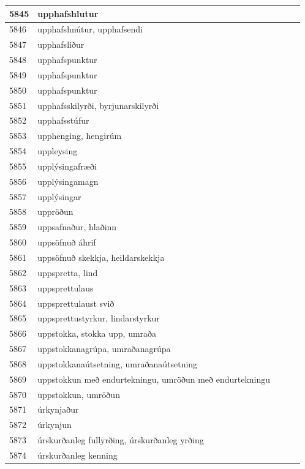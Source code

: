 \begin{longtable}{p{}|p{}|p{}|p{}|p{}}
\hline
5845 & upphafshlutur &  &  &  \\
\hline
5846 & upphafshnútur, upphafsendi &  &  &  \\
\hline
5847 & upphafsliður &  &  &  \\
\hline
5848 & upphafspunktur &  &  &  \\
\hline
5849 & upphafspunktur &  &  &  \\
\hline
5850 & upphafspunktur &  &  &  \\
\hline
5851 & upphafsskilyrði, byrjunarskilyrði &  &  &  \\
\hline
5852 & upphafsstúfur &  &  &  \\
\hline
5853 & upphenging, hengirúm &  &  &  \\
\hline
5854 & uppleysing &  &  &  \\
\hline
5855 & upplýsingafræði &  &  &  \\
\hline
5856 & upplýsingamagn &  &  &  \\
\hline
5857 & upplýsingar &  &  &  \\
\hline
5858 & uppröðun &  &  &  \\
\hline
5859 & uppsafnaður, hlaðinn &  &  &  \\
\hline
5860 & uppsöfnuð áhrif &  &  &  \\
\hline
5861 & uppsöfnuð skekkja, heildarskekkja &  &  &  \\
\hline
5862 & uppspretta, lind &  &  &  \\
\hline
5863 & uppsprettulaus &  &  &  \\
\hline
5864 & uppsprettulaust svið &  &  &  \\
\hline
5865 & uppsprettustyrkur, lindarstyrkur &  &  &  \\
\hline
5866 & uppstokka, stokka upp, umraða &  &  &  \\
\hline
5867 & uppstokkanagrúpa, umraðanagrúpa &  &  &  \\
\hline
5868 & uppstokkanaútsetning, umraðanaútsetning &  &  &  \\
\hline
5869 & uppstokkun með endurtekningu, umröðun með endurtekningu &  &  &  \\
\hline
5870 & uppstokkun, umröðun &  &  &  \\
\hline
5871 & úrkynjaður &  &  &  \\
\hline
5872 & úrkynjun &  &  &  \\
\hline
5873 & úrskurðanleg fullyrðing, úrskurðanleg yrðing &  &  &  \\
\hline
5874 & úrskurðanleg kenning &  &  &  \\

\end{longtable}
